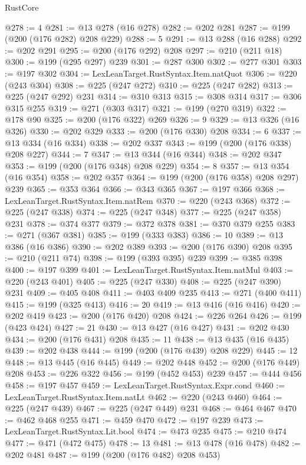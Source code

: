 \begin{lexlean}{RustCore}
\begin{coremodule}
@278 := 4
@281 := @13 @278 (@16 @278)
@282 := @202 @281
@287 := @199 (@200 (@176 @282) @208 @229)
@288 := 5
@291 := @13 @288 (@16 @288)
@292 := @202 @291
@295 := @200 (@176 @292) @208
@297 := @210 (@211 @18)
@300 := @199 (@295 @297) @239
@301 := @287 @300
@302 := @277 @301
@303 := @197 @302
@304 := LexLeanTarget.RustSyntax.Item.natQuot
@306 := @220 (@243 @304)
@308 := @225 (@247 @272)
@310 := @225 (@247 @282)
@313 := @225 (@247 @292) @231
@314 := @310 @313
@315 := @308 @314
@317 := @306 @315 @255
@319 := @271 (@303 @317)
@321 := @199 (@270 @319)
@322 := @178 @90
@325 := @200 (@176 @322) @269
@326 := 9
@329 := @13 @326 (@16 @326)
@330 := @202 @329
@333 := @200 (@176 @330) @208
@334 := 6
@337 := @13 @334 (@16 @334)
@338 := @202 @337
@343 := @199 (@200 (@176 @338) @208 @227)
@344 := 7
@347 := @13 @344 (@16 @344)
@348 := @202 @347
@353 := @199 (@200 (@176 @348) @208 @229)
@354 := 8
@357 := @13 @354 (@16 @354)
@358 := @202 @357
@364 := @199 (@200 (@176 @358) @208 @297) @239
@365 := @353 @364
@366 := @343 @365
@367 := @197 @366
@368 := LexLeanTarget.RustSyntax.Item.natRem
@370 := @220 (@243 @368)
@372 := @225 (@247 @338)
@374 := @225 (@247 @348)
@377 := @225 (@247 @358) @231
@378 := @374 @377
@379 := @372 @378
@381 := @370 @379 @255
@383 := @271 (@367 @381)
@385 := @199 (@333 @383)
@386 := 10
@389 := @13 @386 (@16 @386)
@390 := @202 @389
@393 := @200 (@176 @390) @208
@395 := @210 (@211 @74)
@398 := @199 (@393 @395) @239
@399 := @385 @398
@400 := @197 @399
@401 := LexLeanTarget.RustSyntax.Item.natMul
@403 := @220 (@243 @401)
@405 := @225 (@247 @330)
@408 := @225 (@247 @390) @231
@409 := @405 @408
@411 := @403 @409 @235
@413 := @271 (@400 @411)
@415 := @199 (@325 @413)
@416 := 20
@419 := @13 @416 (@16 @416)
@420 := @202 @419
@423 := @200 (@176 @420) @208
@424 := @226 @264
@426 := @199 (@423 @424)
@427 := 21
@430 := @13 @427 (@16 @427)
@431 := @202 @430
@434 := @200 (@176 @431) @208
@435 := 11
@438 := @13 @435 (@16 @435)
@439 := @202 @438
@444 := @199 (@200 (@176 @439) @208 @229)
@445 := 12
@448 := @13 @445 (@16 @445)
@449 := @202 @448
@452 := @200 (@176 @449) @208
@453 := @226 @322
@456 := @199 (@452 @453) @239
@457 := @444 @456
@458 := @197 @457
@459 := LexLeanTarget.RustSyntax.Expr.cond
@460 := LexLeanTarget.RustSyntax.Item.natLt
@462 := @220 (@243 @460)
@464 := @225 (@247 @439)
@467 := @225 (@247 @449) @231
@468 := @464 @467
@470 := @462 @468 @255
@471 := @459 @470
@472 := @197 @239
@473 := LexLeanTarget.RustSyntax.Lit.bool
@474 := @473 @235
@475 := @210 @474
@477 := @471 (@472 @475)
@478 := 13
@481 := @13 @478 (@16 @478)
@482 := @202 @481
@487 := @199 (@200 (@176 @482) @208 @453)

\end{coremodule}
\end{lexlean}
